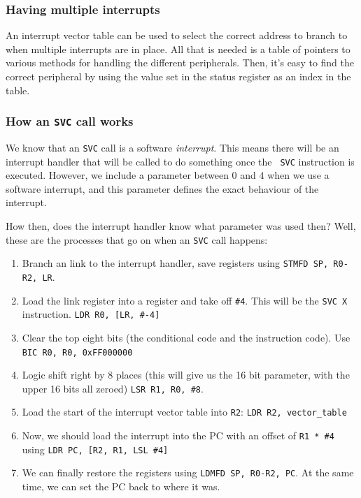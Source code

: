 \subsubsection{Having multiple interrupts}

An interrupt vector table can be used to select the correct address to branch to
when multiple interrupts are in place. All that is needed is a table of pointers
to various methods for handling the different peripherals. Then, it's easy to
find the correct peripheral by using the value set in the status register as an
index in the table.

\subsubsection{How an {\tt SVC} call works}

We know that an {\tt SVC} call is a software {\it interrupt}. This means there
will be an interrupt handler that will be called to do something once the {\tt
SVC} instruction is executed. However, we include a parameter between $0$ and
$4$ when we use a software interrupt, and this parameter defines the exact
behaviour of the interrupt.

How then, does the interrupt handler know what parameter was used then? Well,
these are the processes that go on when an {\tt SVC} call happens:

\begin{enumerate}
	\item Branch an link to the interrupt handler, save registers using 
	{\tt STMFD SP, {R0-R2, LR}}.

	\item Load the link register into a register and take off {\tt \#4}. This
	will be the {\tt SVC X} instruction. {\tt LDR R0, [LR, \#-4]}

	\item Clear the top eight bits (the conditional code and the instruction
	code). Use {\tt BIC R0, R0, 0xFF000000}

	\item Logic shift right by 8 places (this will give us the 16 bit parameter,
	with the upper 16 bits all zeroed) {\tt LSR R1, R0, \#8}.

	\item Load the start of the interrupt vector table into {\tt R2}: 
	{\tt LDR R2, vector\_table}

	\item Now, we should load the interrupt into the PC with an offset of
	{\tt R1 * \#4} using {\tt LDR PC, [R2, R1, LSL \#4]}

	\item We can finally restore the registers using 
	{\tt LDMFD SP, {R0-R2, PC}}. At the same time, we can set the PC back to 
	where it was.
\end{enumerate}

